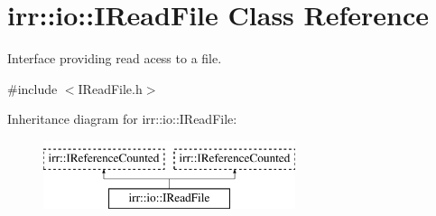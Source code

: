 \hypertarget{classirr_1_1io_1_1IReadFile}{}\section{irr\+:\+:io\+:\+:I\+Read\+File Class Reference}
\label{classirr_1_1io_1_1IReadFile}


Interface providing read acess to a file.  




{\ttfamily \#include $<$I\+Read\+File.\+h$>$}

Inheritance diagram for irr\+:\+:io\+:\+:I\+Read\+File\+:\begin{figure}[H]
\begin{center}
\leavevmode
\includegraphics[height=2.000000cm]{classirr_1_1io_1_1IReadFile}
\end{center}
\end{figure}

